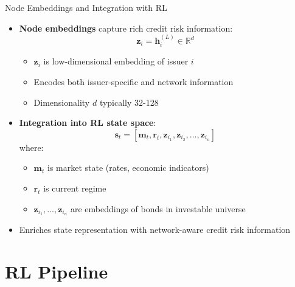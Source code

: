 \documentclass{beamer}
\begin{document}
\begin{frame}{Node Embeddings and Integration with RL}
\begin{itemize}
    \item \textbf{Node embeddings} capture rich credit risk information:
    \begin{equation}
    \mathbf{z}_i = \mathbf{h}_i^{(L)} \in \mathbb{R}^d
    \end{equation}
    \begin{itemize}
        \item $\mathbf{z}_i$ is low-dimensional embedding of issuer $i$
        \item Encodes both issuer-specific and network information
        \item Dimensionality $d$ typically 32-128
    \end{itemize}
    \item \textbf{Integration into RL state space}:
    \begin{equation}
    \mathbf{s}_t = [\mathbf{m}_t, \mathbf{r}_t, \mathbf{z}_{i_1}, \mathbf{z}_{i_2}, ..., \mathbf{z}_{i_n}]
    \end{equation}
    where:
    \begin{itemize}
        \item $\mathbf{m}_t$ is market state (rates, economic indicators)
        \item $\mathbf{r}_t$ is current regime
        \item $\mathbf{z}_{i_1}, ..., \mathbf{z}_{i_n}$ are embeddings of bonds in investable universe
    \end{itemize}
    \item Enriches state representation with network-aware credit risk information
\end{itemize}
\end{frame}

\section{RL Pipeline}
\end{document}
